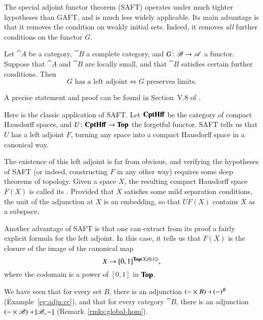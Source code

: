 The special adjoint functor theorem (SAFT) operates under much tighter
hypotheses than GAFT, and is much less widely applicable.  Its main
advantage is that it removes the condition on weakly initial sets.  Indeed,
it removes \emph{all} further conditions on the functor $G$.

\begin{thm}
%
%
%
%
Let $\cat{A}$ be a category, $\cat{B}$ a complete category, and $G\from
\cat{B} \to \cat{A}$ a functor.  Suppose that $\cat{A}$ and $\cat{B}$ are
locally small, and that $\cat{B}$ satisfies certain further conditions.  Then
\[
G \text{ has a left adjoint}
\iff
G \text{ preserves limits}.
\]
\end{thm}
% 
A precise statement and proof can be found in Section~V.8 of \citeCWM.

\begin{example}
Here is the classic application of SAFT.  Let $\mathbf{CptHff}$%
%
%
be the category of compact Hausdorff spaces, and $U\from \CptHff \to \Tp$
the forgetful functor.  SAFT tells us that $U$ has a left adjoint $F$,
turning any space into a compact Hausdorff space in a canonical way.

The existence of this left adjoint is far from obvious, and verifying the
hypotheses of SAFT (or indeed, constructing $F$ in any other way) requires
some deep theorems of topology.  Given a space $X$, the resulting compact
Hausdorff space $F(X)$ is called its .  Provided that $X$ satisfies some mild separation
conditions, the unit of the adjunction at $X$ is an embedding, so that
$UF(X)$ contains $X$ as a subspace. 

Another advantage of SAFT is that one can extract from its proof a fairly
explicit formula for the left adjoint.  In this case, it tells us that
$F(X)$ is the closure of the image of the canonical map
\[
X \to [0, 1]^{\mathbf{Top}(X, [0, 1])}, 
\]
where the codomain is a power of $[0, 1]$ in $\mathbf{Top}$.  
%
%
\end{example}


%
%
%

We have seen that for every set $B$, there is an adjunction $(-\times B)
\dashv (-)^B$ (Example~\ref{eg:adjn:cc}), and that for every category
$\cat{B}$, there is an adjunction $(- \times \mathscr{B}) \dashv
[\mathscr{B},-]$
(Remark~\ref{rmks:global-hom}).


